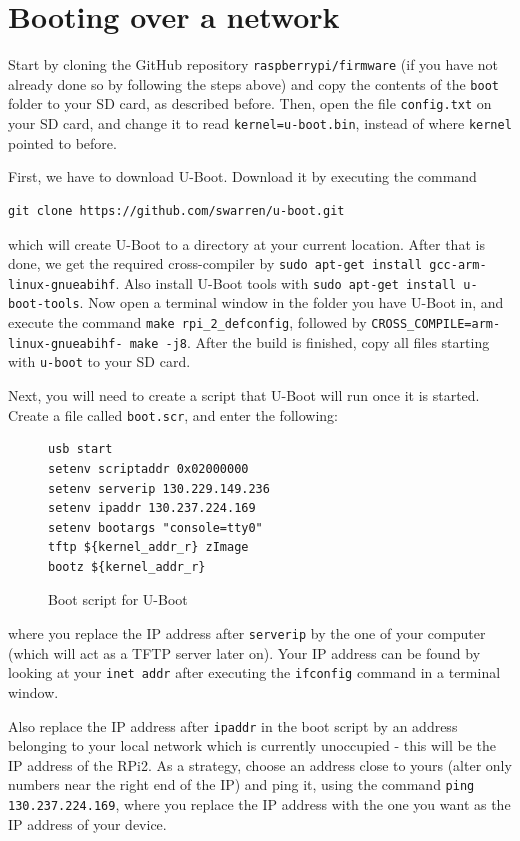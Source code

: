 \documentclass[a4paper,11pt,reqno]{amsart}
\begin{document}
{\section{Booting over a network}
Start by cloning the GitHub repository \texttt{raspberrypi/firmware} (if you have not already done so by following the steps above) and copy the contents of the \texttt{boot} folder to your SD card, as described before. Then, open the file \texttt{config.txt} on your SD card, and change it to read \texttt{kernel=u-boot.bin}, instead of where \texttt{kernel} pointed to before.

First, we have to download U-Boot. Download it by executing the command

\begin{verbatim}
git clone https://github.com/swarren/u-boot.git
\end{verbatim}

which will create U-Boot to a directory at your current location. After that is done, we get the required cross-compiler by \texttt{sudo apt-get install gcc-arm-linux-gnueabihf}. Also install U-Boot tools with \texttt{sudo apt-get install u-boot-tools}. Now open a terminal window in the folder you have U-Boot in, and execute the command \texttt{make rpi\_2\_defconfig}, followed by \texttt{CROSS\_COMPILE=arm-linux-gnueabihf- make -j8}. After the build is finished, copy all files starting with \texttt{u-boot} to your SD card.

Next, you will need to create a script that U-Boot will run once it is started. Create a file called \texttt{boot.scr}, and enter the following:

\begin{figure}[hb]
\begin{center}
\begin{BVerbatim}
usb start
setenv scriptaddr 0x02000000
setenv serverip 130.229.149.236
setenv ipaddr 130.237.224.169
setenv bootargs "console=tty0"
tftp ${kernel_addr_r} zImage
bootz ${kernel_addr_r}
\end{BVerbatim}
\end{center}
\caption{Boot script for U-Boot}
\label{fig:boots}
\end{figure}

where you replace the IP address after \texttt{serverip} by the one of your computer (which will act as a TFTP server later on). Your IP address can be found by looking at your \texttt{inet addr} after executing the \texttt{ifconfig} command in a terminal window.

Also replace the IP address after \texttt{ipaddr} in the boot script by an address belonging to your local network which is currently unoccupied - this will be the IP address of the RPi2. As a strategy, choose an address close to yours (alter only numbers near the right end of the IP) and ping it, using the command \texttt{ping 130.237.224.169}, where you replace the IP address with the one you want as the IP address of your device.

}
\end{document}
